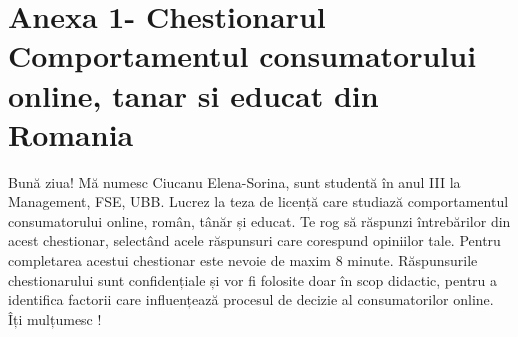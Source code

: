 \documentclass[a4paper, 12pt]{article}
\begin{document}
\section{Anexa 1- Chestionarul Comportamentul consumatorului online, tanar si educat din Romania }	
	\quad Bună ziua! Mă numesc Ciucanu Elena-Sorina, sunt studentă în anul III la Management, FSE, UBB. Lucrez la teza de licență care studiază comportamentul consumatorului online, român, tânăr și educat. Te rog să răspunzi întrebărilor din acest chestionar, selectând acele răspunsuri care corespund opiniilor tale. Pentru completarea acestui chestionar este nevoie de maxim 8 minute. Răspunsurile chestionarului sunt confidențiale și vor fi folosite doar în scop didactic, pentru a identifica factorii care influențează procesul de decizie al consumatorilor online. Îți mulțumesc !
\newline
\end{document}
